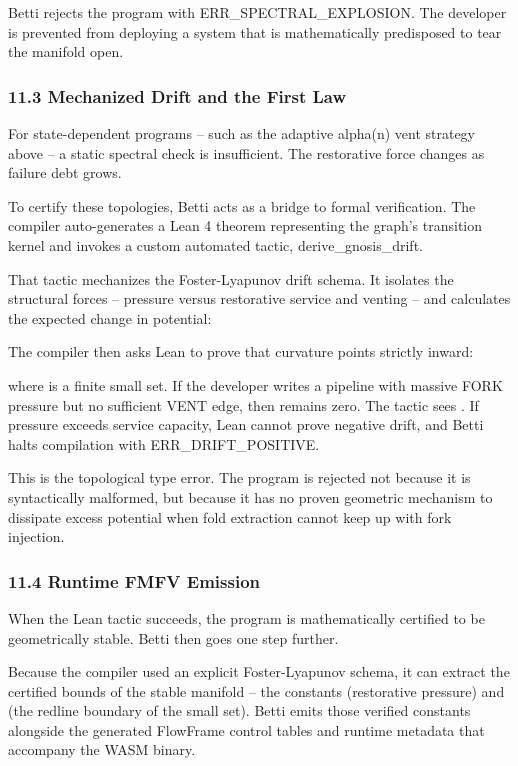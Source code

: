 \documentclass[
]{article}
\begin{document}
Betti rejects the program with ERR\_SPECTRAL\_EXPLOSION. The developer
is prevented from deploying a system that is mathematically predisposed
to tear the manifold open.

\subsubsection{\texorpdfstring{\textbf{11.3 Mechanized Drift and the
First
Law}}{11.3 Mechanized Drift and the First Law}}\label{mechanized-drift-and-the-first-law}

For state-dependent programs -- such as the adaptive alpha(n) vent
strategy above -- a static spectral check is insufficient. The
restorative force changes as failure debt grows.

To certify these topologies, Betti acts as a bridge to formal
verification. The compiler auto-generates a Lean 4 theorem representing
the graph's transition kernel and invokes a custom automated tactic,
derive\_gnosis\_drift.

That tactic mechanizes the Foster-Lyapunov drift schema. It isolates the
structural forces -- pressure versus restorative service and venting --
and calculates the expected change in potential:

The compiler then asks Lean to prove that curvature points strictly
inward:

where is a finite small set. If the developer writes a pipeline with
massive FORK pressure but no sufficient VENT edge, then remains zero.
The tactic sees . If pressure exceeds service capacity, Lean cannot
prove negative drift, and Betti halts compilation with
ERR\_DRIFT\_POSITIVE.

This is the topological type error. The program is rejected not because
it is syntactically malformed, but because it has no proven geometric
mechanism to dissipate excess potential when fold extraction cannot keep
up with fork injection.

\subsubsection{\texorpdfstring{\textbf{11.4 Runtime FMFV
Emission}}{11.4 Runtime FMFV Emission}}\label{runtime-fmfv-emission}

When the Lean tactic succeeds, the program is mathematically certified
to be geometrically stable. Betti then goes one step further.

Because the compiler used an explicit Foster-Lyapunov schema, it can
extract the certified bounds of the stable manifold -- the constants
(restorative pressure) and (the redline boundary of the small set).
Betti emits those verified constants alongside the generated FlowFrame
control tables and runtime metadata that accompany the WASM binary.
\end{document}
